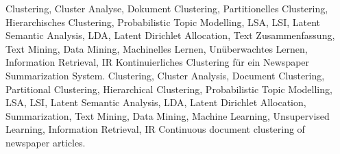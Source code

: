 \HAWAbstractPage
  {
    Clustering, 
    Cluster Analyse, 
    Dokument Clustering, 
    Partitionelles Clustering,
    Hierarchisches Clustering,
    Probabilistic Topic Modelling, 
    LSA, LSI, Latent Semantic Analysis,
    LDA, Latent Dirichlet Allocation, 
    Text Zusammenfassung,
    Text Mining, Data Mining,
    Machinelles Lernen, Unüberwachtes Lernen, 
    Information Retrieval, IR
  }
  { 
    Kontinuierliches Clustering für ein Newspaper Summarization System.
  }
  { 
    Clustering, 
    Cluster Analysis, 
    Document Clustering, 
    Partitional Clustering,
    Hierarchical Clustering,
    Probabilistic Topic Modelling, 
    LSA, LSI, Latent Semantic Analysis,
    LDA, Latent Dirichlet Allocation, 
    Summarization,
    Text Mining, Data Mining,
    Machine Learning, Unsupervised Learning, 
    Information Retrieval, IR
  }
  {
    Continuous document clustering of newspaper articles.
  }